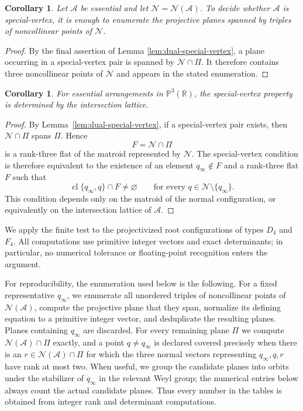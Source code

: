 \documentclass[11pt]{article}
\newtheorem{corollary}[theorem]{Corollary}
\theoremstyle{definition}
\theoremstyle{remark}
\newcommand{\PP}{\mathbb P}
\newcommand{\RR}{\mathbb R}
\newcommand{\cA}{\mathcal A}
\newcommand{\cN}{\mathcal N}
\begin{document}
\begin{corollary}
\label{cor:finite-test}
Let $\cA$ be essential and let $\cN=\cN(\cA)$.  To decide whether $\cA$
is special-vertex, it is enough to enumerate the projective planes spanned
by triples of noncollinear points of $\cN$.
\end{corollary}

\begin{proof}
By the final assertion of Lemma \ref{lem:dual-special-vertex}, a plane occurring
in a special-vertex pair is spanned by $\cN\cap\Pi$.  It therefore contains
three noncollinear points of $\cN$ and appears in the stated enumeration.
\end{proof}

\begin{corollary}\label{cor:special-combinatorial}
For essential arrangements in $\PP^3(\RR)$, the special-vertex property
is determined by the intersection lattice.
\end{corollary}

\begin{proof}
By Lemma~\ref{lem:dual-special-vertex}, if a special-vertex pair exists,
then $\cN\cap\Pi$ spans $\Pi$. Hence
\[
F=\cN\cap\Pi
\]
is a rank-three flat of the matroid represented by $\cN$. The
special-vertex condition is therefore equivalent to the existence of an
element $q_\infty\notin F$ and a rank-three flat $F$ such that
\[
\operatorname{cl}\{q_\infty,q\}\cap F\neq\varnothing
\qquad
\text{for every }q\in\cN\setminus\{q_\infty\}.
\]
This condition depends only on the matroid of the normal configuration,
or equivalently on the intersection lattice of $\cA$.
\end{proof}


We apply the finite test to the projectivized root configurations of types
$D_4$ and $F_4$.  All computations use primitive integer vectors and exact
determinants; in particular, no numerical tolerance or floating-point
recognition enters the argument.

For reproducibility, the enumeration used below is the following.  For a
fixed representative $q_\infty$, we enumerate all unordered triples of
noncollinear points of $\cN(\cA)$, compute the projective plane that they
span, normalize its defining equation to a primitive integer vector, and
deduplicate the resulting planes.  Planes containing $q_\infty$ are
discarded.  For every remaining plane $\Pi$ we compute
$\cN(\cA)\cap\Pi$ exactly, and a point $q\neq q_\infty$ is declared covered
precisely when there is an $r\in\cN(\cA)\cap\Pi$ for which the three normal
vectors representing $q_\infty,q,r$ have rank at most two.  When useful, we group the candidate planes into orbits under the stabilizer of $q_\infty$ in the relevant Weyl group; the numerical entries
below always count the actual candidate planes.  Thus every number in the
tables is obtained from integer rank and determinant computations.
\end{document}
